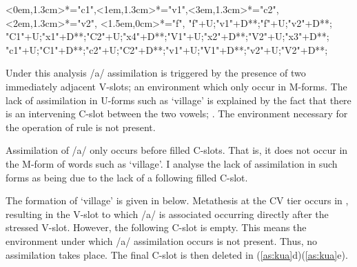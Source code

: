 \begin{multicols}{3}
\begin{exe}
{\begin{xlist}
{			<0em,1.3cm>*="c1",<1em,1.3cm>*="v1",<3em,1.3cm>*="c2",<2em,1.3cm>*="v2",
			<1.5em,0cm>*="f",
			"f"+U;"v1"+D**\dir{-};"f"+U;"v2"+D**\dir{-};
			"C1"+U;"x1"+D**\dir{-};"C2"+U;"x4"+D**\dir{-};"V1"+U;"x2"+D**\dir{-};"V2"+U;"x3"+D**\dir{-};
			"c1"+U;"C1"+D**\dir{-};"c2"+U;"C2"+D**\dir{-};"v1"+U;"V1"+D**\dir{-};"v2"+U;"V2"+D**\dir{-};
		\endxy}\label{as:niim6}
	\end{xlist}}
\end{exe}
\end{multicols}

Under this analysis /a/ assimilation is triggered by the presence
of two immediately adjacent V-slots;
an environment which only occur in M-forms.
The lack of assimilation in U-forms such as  `village' is
explained by the fact that there is an intervening C-slot between
the two vowels; .
The environment necessary for the operation
of rule  is not present.

Assimilation of /a/ only occurs before filled C-slots.
That is, it does not occur in the M-form of words
such as  {\ra}  `village'.
I analyse the lack of assimilation in such forms as being due
to the lack of a following filled C-slot.

The formation of  {\ra}  `village'
is given in  below.
Metathesis at the CV tier occurs in ,
resulting in the V-slot to which /a/ is associated occurring directly after the stressed V-slot.
However, the following C-slot is empty.
This means the environment under which /a/ assimilation occurs is not present.
Thus, no assimilation takes place.
The final C-slot is then deleted in (\ref{as:kua}d){\textendash}(\ref{as:kua}e).

